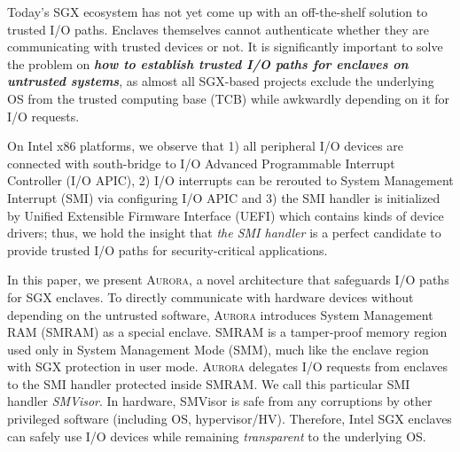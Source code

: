 Today's SGX ecosystem has not yet come up with an off-the-shelf solution to trusted I/O paths. Enclaves themselves cannot authenticate whether they are communicating with trusted devices or not. It is significantly important to solve the problem on \textbf{\emph{how to establish trusted I/O paths for enclaves on untrusted systems}}, as almost all SGX-based projects exclude the underlying OS from the trusted computing base (TCB) while awkwardly depending on it for I/O requests.

On Intel x86 platforms, we observe that 1) all peripheral I/O devices are connected with south-bridge to I/O Advanced Programmable Interrupt Controller (I/O APIC), 2) I/O interrupts can be rerouted to System Management Interrupt (SMI) via configuring I/O APIC and 3) the SMI handler is initialized by Unified Extensible Firmware Interface (UEFI) which contains kinds of device drivers; thus, we hold the insight that \textit{the SMI handler} is a perfect candidate to provide trusted I/O paths for security-critical applications.

In this paper, we present \textsc{Aurora}, a novel architecture that safeguards I/O paths for SGX enclaves. To directly communicate with hardware devices without depending on the untrusted software, \textsc{Aurora} introduces System Management RAM (SMRAM) as a special enclave. SMRAM is a tamper-proof memory region used only in System Management Mode (SMM), much like the enclave region with SGX protection in user mode. \textsc{Aurora} delegates I/O requests from enclaves to the SMI handler protected inside SMRAM. We call this particular SMI handler \textit{SMVisor}. In hardware, SMVisor is safe from any corruptions by other privileged software (including OS, hypervisor/HV). Therefore, Intel SGX enclaves can safely use I/O devices while remaining  \textit{transparent} to the underlying OS.

